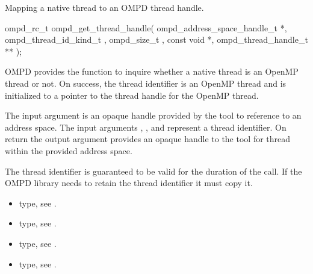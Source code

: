 \label{ompd:ompd_get_thread_handle}
\summary
Mapping a native thread to an OMPD thread handle.
\format
\cspecificstart
\begin{ompSyntax}
	ompd_rc_t ompd_get_thread_handle(
  	ompd_address_space_handle_t *,
  	ompd_thread_id_kind_t           ,
  	ompd_size_t                    ,
  	const void *,
  	ompd_thread_handle_t **
  	);
\end{ompSyntax}
\cspecificend

\descr
OMPD provides the function 
to inquire whether a native thread is an OpenMP
thread or not.
On success, the thread identifier is an OpenMP thread and 
is initialized to a pointer to the thread handle for the OpenMP thread.

\argdesc


The input argument  is an opaque handle provided by the tool
to reference to an address space.
The input arguments ,  , and  represent a
thread identifier. 
On return the output argument  provides an opaque handle to the
tool for thread within the provided address space.

The thread identifier  is guaranteed to be valid for the duration of the call. If the 
OMPD library needs to retain the thread identifier it must copy it.





\crossreferences
\begin{itemize}
	\item {} type, see .
	\item {} type, see .
	\item {} type, see .
	\item {} type, see .
\end{itemize}

